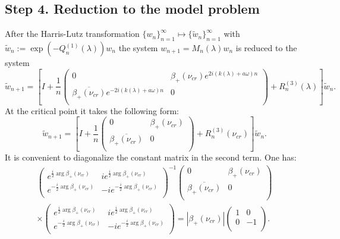 \documentclass[a4paper,oneside,12pt]{amsart}
\begin{document}
\subsection*{Step 4. Reduction to the model problem}
After the Harris-Lutz transformation $\{w_n\}_{n=1}^{\infty}\mapsto\{\widetilde w_n\}_{n=1}^{\infty}$ with
\linebreak
$\widetilde w_n:=\exp(-Q^{(1)}_n(\lambda))w_n$ the system $w_{n+1}=M_n(\lambda)w_n$ is reduced to the system
\begin{equation*}
    \widetilde w_{n+1}=
    \left[
    I+\frac1n
    \left(    \begin{array}{cc}
    0 & \beta_+(\nu_{cr})e^{2i(k(\lambda)+a\omega)n} \\
    \overline{\beta_+(\nu_{cr})}e^{-2i(k(\lambda)+a\omega)n} & 0 \\
    \end{array}    \right)
    +R^{(3)}_n(\lambda)
    \right]
    \widetilde w_n.
\end{equation*}
At the critical point it takes the following form:
\begin{equation*}
    \widetilde w_{n+1}=
    \left[
    I+\frac1n
    \left(    \begin{array}{cc}
    0 & \beta_+(\nu_{cr})\\
    \overline{\beta_+(\nu_{cr})} & 0 \\
    \end{array}    \right)
    +R_n^{(3)}(\nu_{cr})
    \right]
    \widetilde w_n.
\end{equation*}
It is convenient to diagonalize the constant matrix in the second term. One has:
\begin{multline*}
    \left(        \begin{array}{cc}
        e^{\frac i2\arg \beta_+(\nu_{cr})} & ie^{\frac i2\arg \beta_+(\nu_{cr})} \\
        e^{-\frac i2\arg \beta_+(\nu_{cr})} & -ie^{-\frac i2\arg \beta_+(\nu_{cr})} \\
        \end{array}    \right)^{-1}
    \left(    \begin{array}{cc}
    0 & \beta_+(\nu_{cr})\\
    \overline{\beta_+(\nu_{cr})} & 0 \\
    \end{array}    \right)
    \\
    \times
    \left(        \begin{array}{cc}
        e^{\frac i2\arg \beta_+(\nu_{cr})} & ie^{\frac i2\arg \beta_+(\nu_{cr})} \\
        e^{-\frac i2\arg \beta_+(\nu_{cr})} & -ie^{-\frac i2\arg \beta_+(\nu_{cr})} \\
        \end{array}    \right)
    =|\beta_+(\nu_{cr})|
    \left(
      \begin{array}{cc}
        1 & 0 \\
        0 & -1 \\
      \end{array}
    \right).
\end{multline*}
\end{document}
